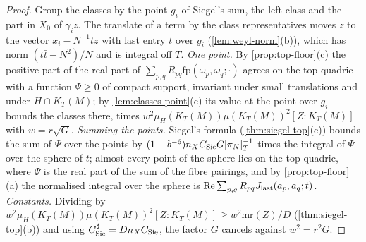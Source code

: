 \begin{proof}
Group the classes by the point $g_i$ of Siegel's sum, the left class and the part in $X_0$ of $\gamma_iz$. The translate of a term by the class representatives moves $z$ to the vector $x_i-N^{-1}tz$ with last entry $t$ over $g_i$
(\cref{lem:weyl-norm}(b)), which has norm $(t\bar t-N^2)/N$ and is integral off $T$. \emph{One point.} By \cref{prop:top-floor}(c) the positive part of the real part of $\sum_{p,q}R_{pq}\mathrm{fp}(\omega_p,\omega_q;\cdot)$ agrees on the top
quadric with a function $\Psi\ge0$ of compact support, invariant under small translations and under $H\cap K_T(M)$; by \cref{lem:classes-point}(c) its value at the point over $g_i$ bounds the classes there, times
$w^2\mu_H(K_T(M))\mu(K_T(M))^2[Z:K_T(M)]$ with $w=r\sqrt G$. \emph{Summing the points.} Siegel's formula (\cref{thm:siegel-top}(c)) bounds the sum of $\Psi$ over the points by $(1+b^{-6})n_XC_{\rm Sie}G\lvert \pi_N\rvert_T^{-1}$ times the
integral of $\Psi$ over the sphere of $t$; almost every point of the sphere lies on the top quadric, where $\Psi$ is the real part of the sum of the fibre pairings, and by \cref{prop:top-floor}(a) the normalised integral over the
sphere is $\operatorname{Re}\sum_{p,q}R_{pq}J_{\rm last}(a_p,a_q;t)$. \emph{Constants.} Dividing by $w^2\mu_H(K_T(M))\mu(K_T(M))^2[Z:K_T(M)]\ge w^2\mathrm{mr}(Z)/D$ (\cref{thm:siegel-top}(b)) and using $C^\sharp_{\rm Sie}=Dn_XC_{\rm Sie}$, the factor $G$ cancels against
$w^2=r^2G$.
\end{proof}

